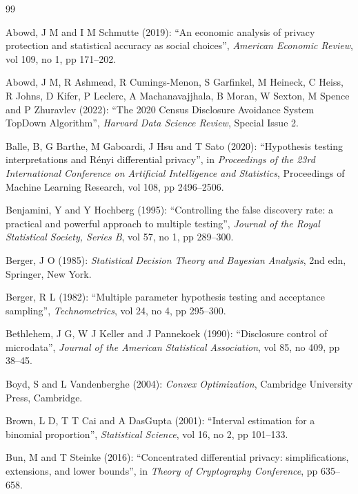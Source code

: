 \documentclass[11pt,a4paper]{article}
\theoremstyle{plain}
\theoremstyle{definition}
\theoremstyle{definition}
\theoremstyle{plain}
\begin{document}
\clearpage
{}
\begin{thebibliography}{99}

Abowd, J M and I M Schmutte (2019): ``An economic analysis of privacy protection and statistical accuracy as social choices'', \emph{American Economic Review}, vol 109, no 1, pp 171--202.

Abowd, J M, R Ashmead, R Cumings-Menon, S Garfinkel, M Heineck, C Heiss, R Johns, D Kifer, P Leclerc, A Machanavajjhala, B Moran, W Sexton, M Spence and P Zhuravlev (2022): ``The 2020 Census Disclosure Avoidance System TopDown Algorithm'', \emph{Harvard Data Science Review}, Special Issue 2.

Balle, B, G Barthe, M Gaboardi, J Hsu and T Sato (2020): ``Hypothesis testing interpretations and R\'enyi differential privacy'', in \emph{Proceedings of the 23rd International Conference on Artificial Intelligence and Statistics}, Proceedings of Machine Learning Research, vol 108, pp 2496--2506.

Benjamini, Y and Y Hochberg (1995): ``Controlling the false discovery rate: a practical and powerful approach to multiple testing'', \emph{Journal of the Royal Statistical Society, Series B}, vol 57, no 1, pp 289--300.

Berger, J O (1985): \emph{Statistical Decision Theory and Bayesian Analysis}, 2nd edn, Springer, New York.

Berger, R L (1982): ``Multiple parameter hypothesis testing and acceptance sampling'', \emph{Technometrics}, vol 24, no 4, pp 295--300.

Bethlehem, J G, W J Keller and J Pannekoek (1990): ``Disclosure control of microdata'', \emph{Journal of the American Statistical Association}, vol 85, no 409, pp 38--45.

Boyd, S and L Vandenberghe (2004): \emph{Convex Optimization}, Cambridge University Press, Cambridge.

Brown, L D, T T Cai and A DasGupta (2001): ``Interval estimation for a binomial proportion'', \emph{Statistical Science}, vol 16, no 2, pp 101--133.

Bun, M and T Steinke (2016): ``Concentrated differential privacy: simplifications, extensions, and lower bounds'', in \emph{Theory of Cryptography Conference}, pp 635--658.


\end{thebibliography}
\end{document}
